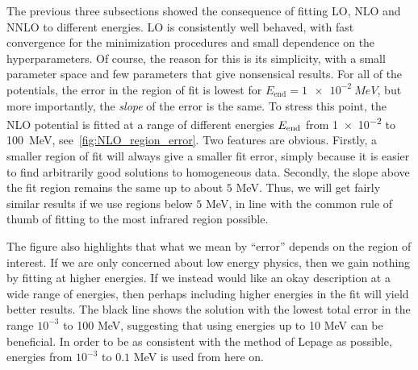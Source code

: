 The previous three subsections showed the consequence of fitting LO, NLO and
NNLO to different energies. LO is consistently well
behaved, with fast convergence for the minimization procedures and small
dependence on the hyperparameters. Of course, the reason for this is its
simplicity, with a small parameter space and few parameters that give
nonsensical results. For all of the potentials, the error in the region of fit is lowest for
\(E_{\text{end}} = \SI{1e-2}{MeV}\), but more importantly, the \textit{slope} of
the error is the same. To stress this point, the NLO potential is fitted at a
range of different energies \(E_{\text{end}}{}\) from \num{1e-2} to \SI{100}{MeV},
see~\cref{fig:NLO_region_error}. Two features are obvious. Firstly, a smaller
region of fit will always give a smaller fit error, simply because it is easier
to find arbitrarily good solutions to homogeneous data.  Secondly, the slope
above the fit region remains the same up to about \(5\) MeV. Thus, we will get
fairly similar results if we use regions below \(5\) MeV, in line with the
common rule of thumb of fitting to the most infrared region possible.

The figure also highlights that what we mean by ``error'' depends on the region
of interest. If we are only concerned about low energy physics, then we gain
nothing by fitting at higher energies. If we instead would like an okay
description at a wide range of energies, then perhaps including higher energies
in the fit will yield better results. The black line shows the solution with the
lowest total error in the range \(10^{-3}\) to 100 MeV, suggesting that
using energies up to 10 MeV can be beneficial. In order to be as consistent with
the method of Lepage as possible, energies from \(10^{-3}\) to \(0.1\) MeV is
used from here on.


